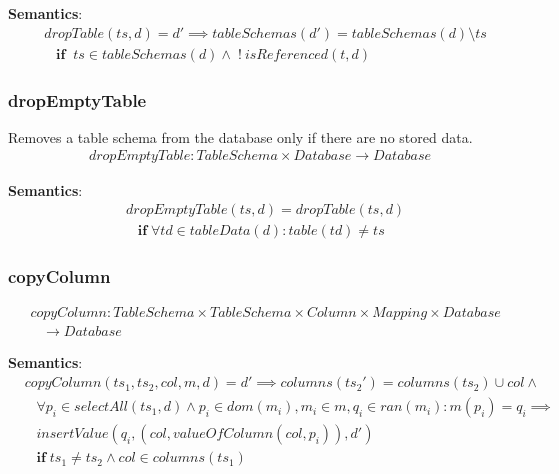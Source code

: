 \documentclass[10pt]{article}
\begin{document}
\noindent \textbf{Semantics}:
\begin{align}
& dropTable(ts, d) = d' \implies tableSchemas(d') = tableSchemas(d) \setminus ts  \nonumber \\
& \;\;\; \mathbf{if}  \;\; ts \in tableSchemas(d) \land \; ! \: isReferenced(t, d)
\end{align}

\subsubsection{dropEmptyTable}
Removes a table schema from the database only if there are no stored data.
\begin{align}
dropEmptyTable:  TableSchema \times Database \rightarrow Database
\end{align}

\noindent \textbf{Semantics}:
\begin{align}
& dropEmptyTable(ts, d) = dropTable(ts, d) \nonumber \\
& \;\;\; \mathbf{if} \; \forall td \in tableData(d) : table(td) \neq ts
\end{align}


\subsubsection{copyColumn}
\begin{align}
& copyColumn: TableSchema \times TableSchema \times Column \times Mapping \times Database   \nonumber \\
& \;\;\; \rightarrow Database
\end{align}

\noindent \textbf{Semantics}:
\begin{align}
& copyColumn(ts_1, ts_2, col, m, d) = d' \implies 
columns(ts_2') = columns(ts_2) \cup col \land \nonumber \\
& \;\;\; \forall p_i \in selectAll(ts_1, d) \land p_i \in dom(m_i), m_i \in m, q_{i} \in ran(m_i) : m(p_i) = q_i \implies \nonumber \\
& \;\;\;  insertValue(q_i, (col, valueOfColumn(col, p_i)), d')  \nonumber \\
& \;\;\; \mathbf{if} \; ts_1 \neq ts_2 \land col \in columns(ts_1)
\end{align}
\end{document}
